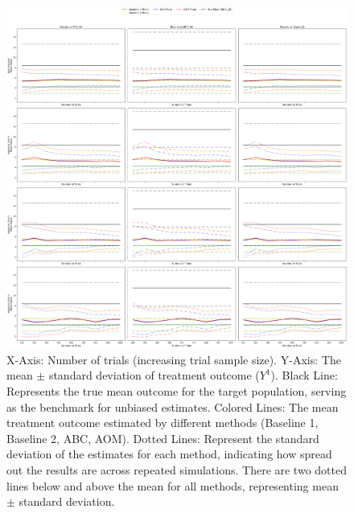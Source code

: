 \documentclass[12pt, oneside]{amsart}
\theoremstyle{definition}
\theoremstyle{remark}
\numberwithin{equation}{section}
\begin{document}
\begin{figure}[hbt!]
    \centering
    \includegraphics[scale=0.15]{Report/Figure/mean_std_results.jpg}
    \caption{X-Axis: Number of trials (increasing trial sample size). Y-Axis: The mean $\pm$ standard deviation of treatment outcome ($Y^1$). Black Line: Represents the true mean outcome for the target population, serving as the benchmark for unbiased estimates. Colored Lines: The mean treatment outcome estimated by different methods (Baseline 1, Baseline 2, ABC, AOM). Dotted Lines: Represent the standard deviation of the estimates for each method, indicating how spread out the results are across repeated simulations. There are two dotted lines below and above the mean for all methods, representing mean $\pm$ standard deviation.}
    \label{mean_std_results}
\end{figure}
\FloatBarrier
\end{document}
